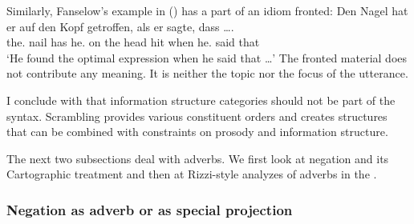 Similarly, Fanselow's example in () has a part of an idiom
fronted:
\ea
\gll Den Nagel hat er auf den Kopf getroffen, als  er sagte, dass \ldots. \\
     the.\ACC{} nail  has he.\NOM{} on  the head hit        when he.\NOM{} said   that\\
\glt `He found the optimal expression when he said that \ldots'
\z
The fronted material does not contribute any meaning. It is neither the topic nor the focus of the
utterance.

I conclude with \citet{Fanselow2006a} that information structure categories should not be part of
the syntax. Scrambling provides various constituent orders and creates structures that can be combined
with constraints on prosody and information structure.

The next two subsections deal with adverbs. We first look at negation and its Cartographic treatment
and then at Rizzi-style analyzes of adverbs in the  \mf.


\subsubsection{Negation as adverb or as special projection}
\label{sec-NegP}

